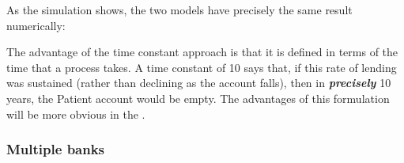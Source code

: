As the simulation shows, the two models have precisely the same result
numerically:
\begin{center}
\par\end{center}

The advantage of the time constant approach is that it is defined
in terms of the time that a process takes. A time constant of 10 says
that, if this rate of lending was sustained (rather than declining
as the account falls), then in \textbf{\em precisely} 10 years, the
Patient account would be empty. The advantages of this formulation
will be more obvious in the .

\subsubsection{Multiple banks}

